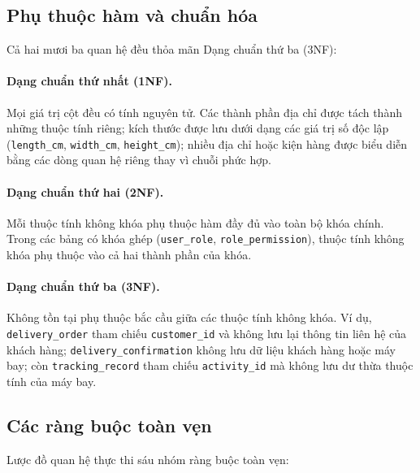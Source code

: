 \subsection{Phụ thuộc hàm và chuẩn hóa}

Cả hai mươi ba quan hệ đều thỏa mãn Dạng chuẩn thứ ba (3NF):

\paragraph{Dạng chuẩn thứ nhất (1NF).}
Mọi giá trị cột đều có tính nguyên tử. Các thành phần địa chỉ được tách thành những thuộc tính riêng; kích thước được lưu dưới dạng các giá trị số độc lập (\texttt{length\_cm}, \texttt{width\_cm}, \texttt{height\_cm}); nhiều địa chỉ hoặc kiện hàng được biểu diễn bằng các dòng quan hệ riêng thay vì chuỗi phức hợp.

\paragraph{Dạng chuẩn thứ hai (2NF).}
Mỗi thuộc tính không khóa phụ thuộc hàm đầy đủ vào toàn bộ khóa chính. Trong các bảng có khóa ghép (\texttt{user\_role}, \texttt{role\_permission}), thuộc tính không khóa phụ thuộc vào cả hai thành phần của khóa.

\paragraph{Dạng chuẩn thứ ba (3NF).}
Không tồn tại phụ thuộc bắc cầu giữa các thuộc tính không khóa. Ví dụ, \texttt{delivery\_order} tham chiếu \texttt{customer\_id} và không lưu lại thông tin liên hệ của khách hàng; \texttt{delivery\_confirmation} không lưu dữ liệu khách hàng hoặc máy bay; còn \texttt{tracking\_record} tham chiếu \texttt{activity\_id} mà không lưu dư thừa thuộc tính của máy bay.

\subsection{Các ràng buộc toàn vẹn}

Lược đồ quan hệ thực thi sáu nhóm ràng buộc toàn vẹn:


